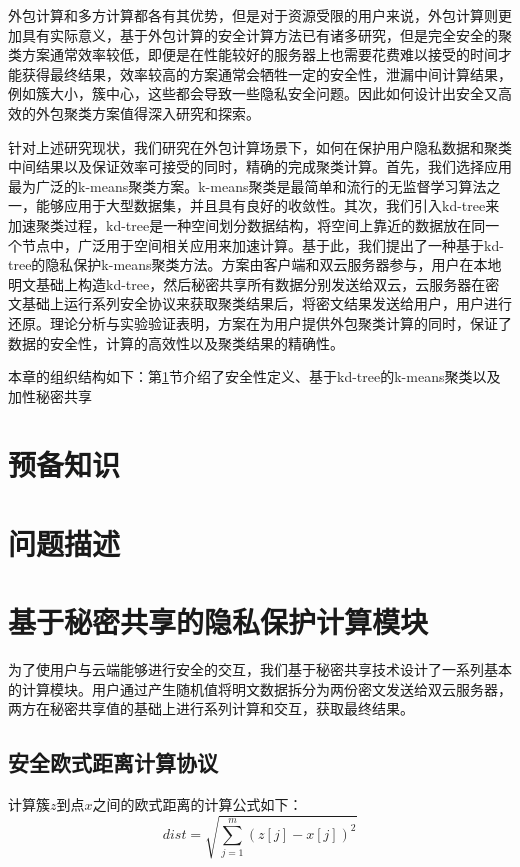 外包计算和多方计算都各有其优势，但是对于资源受限的用户来说，外包计算则更加具有实际意义，基于外包计算的安全计算方法已有诸多研究，但是完全安全的聚类方案通常效率较低，即便是在性能较好的服务器上也需要花费难以接受的时间才能获得最终结果，效率较高的方案通常会牺牲一定的安全性，泄漏中间计算结果，例如簇大小，簇中心，这些都会导致一些隐私安全问题。因此如何设计出安全又高效的外包聚类方案值得深入研究和探索。

针对上述研究现状，我们研究在外包计算场景下，如何在保护用户隐私数据和聚类中间结果以及保证效率可接受的同时，精确的完成聚类计算。首先，我们选择应用最为广泛的k-means聚类方案。k-means聚类是最简单和流行的无监督学习算法之一，能够应用于大型数据集，并且具有良好的收敛性。其次，我们引入kd-tree来加速聚类过程，kd-tree是一种空间划分数据结构，将空间上靠近的数据放在同一个节点中，广泛用于空间相关应用来加速计算。基于此，我们提出了一种基于kd-tree的隐私保护k-means聚类方法。方案由客户端和双云服务器参与，用户在本地明文基础上构造kd-tree，然后秘密共享所有数据分别发送给双云，云服务器在密文基础上运行系列安全协议来获取聚类结果后，将密文结果发送给用户，用户进行还原。理论分析与实验验证表明，方案在为用户提供外包聚类计算的同时，保证了数据的安全性，计算的高效性以及聚类结果的精确性。

本章的组织结构如下：第\ref{s3-yubei}节介绍了安全性定义、基于kd-tree的k-means聚类以及加性秘密共享

\section{预备知识}
\label{s3-yubei}

\section{问题描述}
\label{s3-wenti}

\section{基于秘密共享的隐私保护计算模块}
\label{s3-mokuai}
为了使用户与云端能够进行安全的交互，我们基于秘密共享技术设计了一系列基本的计算模块。用户通过产生随机值将明文数据拆分为两份密文发送给双云服务器，两方在秘密共享值的基础上进行系列计算和交互，获取最终结果。

\subsection{安全欧式距离计算协议}

计算簇$z$到点$x$之间的欧式距离的计算公式如下：
\begin{equation}
    \label{cal_dist}
    dist=\sqrt{\sum_{j=1}^m\left(z[j]-x[j]\right)^2}
\end{equation}

